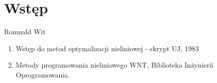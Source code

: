 \section{Wstęp}
  \begin{frame}
    \begin{block}{Romuald Wit}
      \begin{enumerate}
        \item Wstęp do metod optymalizacji nieliniowej - skrypt
        UJ, 1983
        \item Metody programowania nieliniowego WNT, Biblioteka
        Inżynierii Oprogramowania.
      \end{enumerate}
    \end{block}
  \end{frame}
